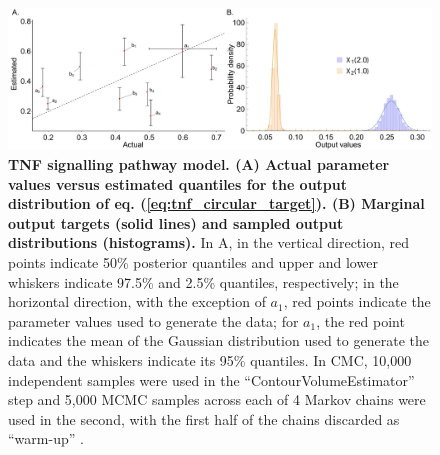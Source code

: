 \begin{figure}[H]
\centerline{\includegraphics[width=1.5\textwidth]{../figures/tnf_circular_both.pdf}}
\caption{\textbf{TNF signalling pathway model. (A) Actual parameter values versus estimated quantiles for the output distribution of eq. (\ref{eq:tnf_circular_target}). (B) Marginal output targets (solid lines) and sampled output distributions (histograms).} In A, in the vertical direction, red points indicate 50\% posterior quantiles and upper and lower whiskers indicate 97.5\% and 2.5\% quantiles, respectively; in the horizontal direction, with the exception of $a_1$, red points indicate the parameter values used to generate the data; for $a_1$, the red point indicates the mean of the Gaussian distribution used to generate the data and the whiskers indicate its 95\% quantiles. In CMC, 10,000 independent samples were used in the ``ContourVolumeEstimator'' step and 5,000 MCMC samples across each of 4 Markov chains were used in the second, with the first half of the chains discarded as ``warm-up'' \cite{lambert2018Student}.}
	\label{fig:tnf_circular_versus}
\end{figure}

